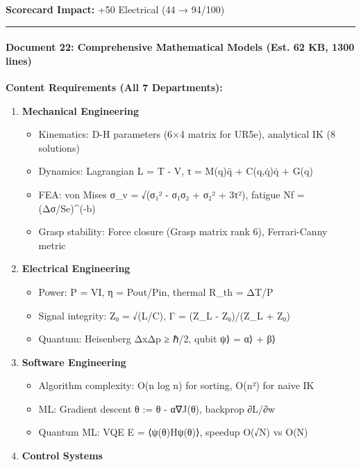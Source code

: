 \documentclass[
]{article}
\providecommand{\tightlist}{%
  \setlength{\itemsep}{0pt}\setlength{\parskip}{0pt}}
\begin{document}
\textbf{Scorecard Impact:} +50 Electrical (44 → 94/100)

\begin{center}\rule{0.5\linewidth}{0.5pt}\end{center}

\hypertarget{document-22-comprehensive-mathematical-models-est.-62-kb-1300-lines}{%
\paragraph{Document 22: Comprehensive Mathematical Models (Est. 62 KB,
1300
lines)}\label{document-22-comprehensive-mathematical-models-est.-62-kb-1300-lines}}

\textbf{Content Requirements (All 7 Departments):}

\begin{enumerate}
\def\labelenumi{\arabic{enumi}.}
\tightlist
\item
  \textbf{Mechanical Engineering}

  \begin{itemize}
  \tightlist
  \item
    Kinematics: D-H parameters (6×4 matrix for UR5e), analytical IK (8
    solutions)
  \item
    Dynamics: Lagrangian L = T - V, τ = M(q)q̈ + C(q,q̇)q̇ + G(q)
  \item
    FEA: von Mises σ\_v = √(σ₁² - σ₁σ₂ + σ₂² + 3τ²), fatigue Nf =
    (Δσ/Se)\^{}(-b)
  \item
    Grasp stability: Force closure (Grasp matrix rank 6), Ferrari-Canny
    metric
  \end{itemize}
\item
  \textbf{Electrical Engineering}

  \begin{itemize}
  \tightlist
  \item
    Power: P = VI, η = Pout/Pin, thermal R\_th = ΔT/P
  \item
    Signal integrity: Z₀ = √(L/C), Γ = (Z\_L - Z₀)/(Z\_L + Z₀)
  \item
    Quantum: Heisenberg ΔxΔp ≥ ℏ/2, qubit \textbar ψ⟩ = α⟩ +
    β⟩
  \end{itemize}
\item
  \textbf{Software Engineering}

  \begin{itemize}
  \tightlist
  \item
    Algorithm complexity: O(n log n) for sorting, O(n²) for naive IK
  \item
    ML: Gradient descent θ := θ - α∇J(θ), backprop ∂L/∂w
  \item
    Quantum ML: VQE E = ⟨ψ(θ)\textbar H\textbar ψ(θ)⟩, speedup O(√N) vs
    O(N)
  \end{itemize}
\item
  \textbf{Control Systems}


\end{enumerate}
\end{document}
